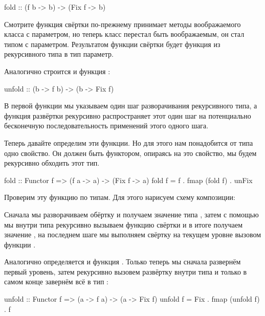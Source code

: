\begin{code}
fold :: (f b -> b) -> (Fix f -> b)
\end{code}

Смотрите функция свёртки по-прежнему принимает методы воображаемого
класса с параметром, но теперь класс перестал быть воображаемым, он стал
типом с параметром. Результатом функции свёртки будет функция из
рекурсивного типа  в тип параметр.

Аналогично строится и функция :


\begin{code}
unfold :: (b -> f b) -> (b -> Fix f)
\end{code}

В первой функции мы указываем один шаг разворачивания рекурсивного типа,
а функция развёртки рекурсивно распространяет этот один шаг на
потенциально бесконечную последовательность применений этого одного
шага.

Теперь давайте определим эти функции. Но для этого нам понадобится от
типа  одно свойство. Он должен быть функтором, опираясь на это
свойство, мы будем рекурсивно обходить этот тип.


\begin{code}
fold :: Functor f => (f a -> a) -> (Fix f -> a)
fold f = f . fmap (fold f) . unFix
\end{code}

Проверим эту функцию по типам. Для этого нарисуем схему композиции:

\begin{centering}



\end{centering}

Сначала мы разворачиваем обёртку  и получаем значение типа
, затем с помощью  мы внутри типа 
рекурсивно вызываем функцию свёртки и в итоге получаем значение
, на последнем шаге мы выполняем свёртку на текущем уровне
вызовом функции .

Аналогично определяется и функция . Только теперь мы сначала
развернём первый уровень, затем рекурсивно вызовем развёртку внутри типа
 и только в самом конце завернём всё в тип :


\begin{code}
unfold :: Functor f => (a -> f a) -> (a -> Fix f)
unfold f = Fix . fmap (unfold f) . f
\end{code}

